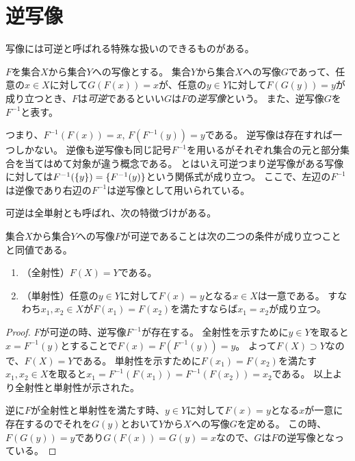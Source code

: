 \section{逆写像}

写像には可逆と呼ばれる特殊な扱いのできるものがある。

\begin{definition}[逆写像]
$F$を集合$X$から集合$Y$への写像とする。
集合$Y$から集合$X$への写像$G$であって、任意の$x \in X$に対して$G(F(x)) = x$が、任意の$y \in Y$に対して$F(G(y)) = y$が成り立つとき、$F$は\emph{可逆}であるといい$G$は$F$の\emph{逆写像}という。
また、逆写像$G$を$F^{-1}$と表す。
\end{definition}

つまり、$F^{-1}(F(x)) = x$, $F(F^{-1}(y)) = y$である。
逆写像は存在すれば一つしかない。
逆像も逆写像も同じ記号$F^{-1}$を用いるがそれぞれ集合の元と部分集合を当てはめて対象が違う概念である。
とはいえ可逆つまり逆写像がある写像に対しては$F^{-1}(\{y\}) = \{F^{-1}(y)\}$という関係式が成り立つ。
ここで、左辺の$F^{-1}$は逆像であり右辺の$F^{-1}$は逆写像として用いられている。

可逆は全単射とも呼ばれ、次の特徴づけがある。

\begin{proposition}
集合$X$から集合$Y$への写像$F$が可逆であることは次の二つの条件が成り立つことと同値である。
\begin{enumerate}
\item
（全射性）$F(X) = Y$である。
\item
（単射性）任意の$y \in Y$に対して$F(x) = y$となる$x \in X$は一意である。
すなわち$x_1, x_2 \in X$が$F(x_1) = F(x_2)$を満たすならば$x_1 = x_2$が成り立つ。
\end{enumerate}
\end{proposition}

\begin{proof}
$F$が可逆の時、逆写像$F^{-1}$が存在する。
全射性を示すために$y \in Y$を取ると$x = F^{-1}(y)$とすることで$F(x) = F(F^{-1}(y)) = y$。
よって$F(X) \supset Y$なので、$F(X) = Y$である。
単射性を示すために$F(x_1) = F(x_2)$を満たす$x_1, x_2 \in X$を取ると$x_1 = F^{-1}(F(x_1)) = F^{-1}(F(x_2)) = x_2$である。
以上より全射性と単射性が示された。

逆に$F$が全射性と単射性を満たす時、$y \in Y$に対して$F(x) = y$となる$x$が一意に存在するのでそれを$G(y)$とおいて$Y$から$X$への写像$G$を定める。
この時、$F(G(y)) = y$であり$G(F(x)) = G(y) = x$なので、$G$は$F$の逆写像となっている。
\end{proof}
